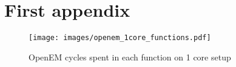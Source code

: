 \chapter{First appendix}
\label{chapter:first-appendix}

\begin{figure}[h!]
    \begin{center}
        \texttt{[image: images/openem\_1core\_functions.pdf]}
        \caption{OpenEM cycles spent in each function on 1 core setup}
        \label{fig:oem1corefunc}
    \end{center}
\end{figure}
